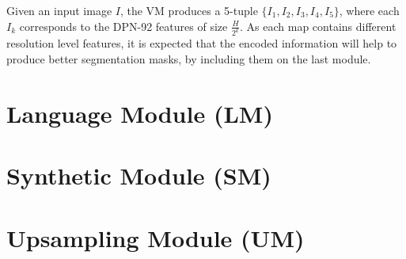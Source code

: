 Given an input image $I$, the VM produces a 5-tuple $\{I_1, I_2, I_3, I_4, I_5\}$, where each $I_k$ corresponds to the DPN-92 features of size $\frac{H}{2^k}$. As each map contains different resolution level features, it is expected that the encoded information will help to produce better segmentation masks, by including them on the last module.


\section{Language Module (LM)}


 
\section{Synthetic Module (SM)}


\section{Upsampling Module (UM)}
\label{section:um}